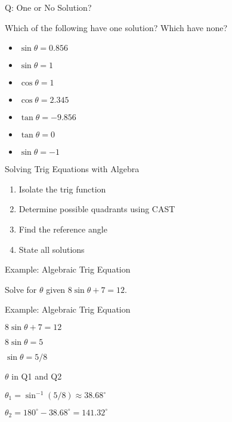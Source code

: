 \documentclass[aspectratio=169]{beamer}
\begin{document}
\begin{frame}{Q: One or No Solution?}
    \begin{tcolorbox}[colback=lightgray,colframe=primary,title=Concept Check]
        \footnotesize
        Which of the following have one solution? Which have none?
        \begin{itemize}
            \item $\sin\theta = 0.856$
            \item $\sin\theta = 1$
            \item $\cos\theta = 1$
            \item $\cos\theta = 2.345$
            \item $\tan\theta = -9.856$
            \item $\tan\theta = 0$
            \item $\sin\theta = -1$
        \end{itemize}
    \end{tcolorbox}
\end{frame}

\begin{frame}{Solving Trig Equations with Algebra}
    \begin{tcolorbox}[colback=lightgray,colframe=accent,title=Steps]
        \footnotesize
        \begin{enumerate}
            \item Isolate the trig function
            \item Determine possible quadrants using CAST
            \item Find the reference angle
            \item State all solutions
        \end{enumerate}
    \end{tcolorbox}
\end{frame}

\begin{frame}{Example: Algebraic Trig Equation}
    \begin{tcolorbox}[colback=lightgray,colframe=primary,title=Question]
        \footnotesize
        Solve for $\theta$ given $8\sin\theta + 7 = 12$.
    \end{tcolorbox}
\end{frame}

\begin{frame}{Example: Algebraic Trig Equation}
    \begin{tcolorbox}[colback=lightgray,colframe=primary,title=Solution]
        \footnotesize
        $8\sin\theta + 7 = 12$\par
        $8\sin\theta = 5$\par
        $\sin\theta = 5/8$\par
        $\theta$ in Q1 and Q2\par
        $\theta_1 = \sin^{-1}(5/8) \approx 38.68^\circ$\par
        $\theta_2 = 180^\circ - 38.68^\circ = 141.32^\circ$
    \end{tcolorbox}
\end{frame}
\end{document}
